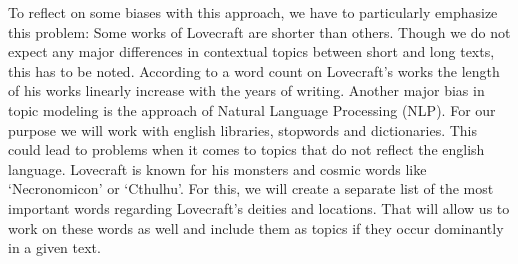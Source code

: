 To reflect on some biases with this approach, we have to particularly emphasize this 
problem: Some works of Lovecraft are shorter than others. Though we do not expect any 
major differences in contextual topics between short and long texts, this has to be 
noted. According to a word count on Lovecraft’s works the length of his works linearly 
increase with the years of writing. Another major bias in topic modeling is the approach 
of Natural Language Processing (NLP). For our purpose we will work with english libraries, 
stopwords and dictionaries. This could lead to problems when it comes to topics that do 
not reflect the english language. Lovecraft is known for his monsters and cosmic words 
like ‘Necronomicon’ or ‘Cthulhu’. For this, we will create a separate list of the most 
important words regarding Lovecraft’s deities and locations. That will allow us to work 
on these words as well and include them as topics if they occur dominantly in a given text.\\